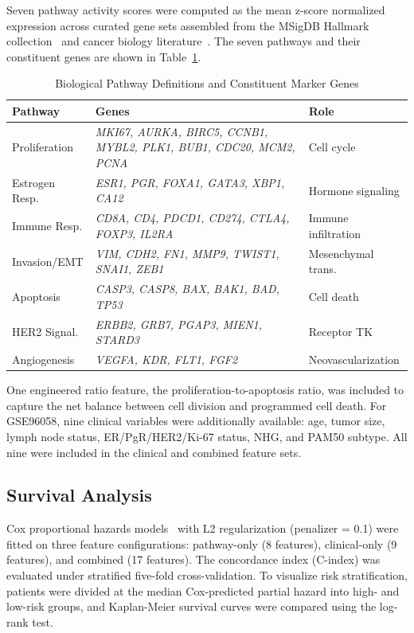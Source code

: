 \documentclass[journal]{IEEEtran}
\begin{document}
Seven pathway activity scores were computed as the mean z-score normalized expression across curated gene sets assembled from the MSigDB Hallmark collection~\cite{liberzon2015} and cancer biology literature~\cite{hanahan2011}. The seven pathways and their constituent genes are shown in Table~\ref{tab:pathways}.

\begin{table}[!t]
\centering
\caption{Biological Pathway Definitions and Constituent Marker Genes}
\label{tab:pathways}
\footnotesize
\begin{tabular}{p{1.6cm} p{3.6cm} p{1.8cm}}
\toprule
\textbf{Pathway} & \textbf{Genes} & \textbf{Role} \\
\midrule
Proliferation & \textit{MKI67, AURKA, BIRC5, CCNB1, MYBL2, PLK1, BUB1, CDC20, MCM2, PCNA} & Cell cycle \\
Estrogen Resp. & \textit{ESR1, PGR, FOXA1, GATA3, XBP1, CA12} & Hormone signaling \\
Immune Resp. & \textit{CD8A, CD4, PDCD1, CD274, CTLA4, FOXP3, IL2RA} & Immune infiltration \\
Invasion/EMT & \textit{VIM, CDH2, FN1, MMP9, TWIST1, SNAI1, ZEB1} & Mesenchymal trans. \\
Apoptosis & \textit{CASP3, CASP8, BAX, BAK1, BAD, TP53} & Cell death \\
HER2 Signal. & \textit{ERBB2, GRB7, PGAP3, MIEN1, STARD3} & Receptor TK \\
Angiogenesis & \textit{VEGFA, KDR, FLT1, FGF2} & Neovascularization \\
\bottomrule
\end{tabular}
\end{table}

One engineered ratio feature, the proliferation-to-apoptosis ratio, was included to capture the net balance between cell division and programmed cell death. For GSE96058, nine clinical variables were additionally available: age, tumor size, lymph node status, ER/PgR/HER2/Ki-67 status, NHG, and PAM50 subtype. All nine were included in the clinical and combined feature sets.

\subsection{Survival Analysis}

Cox proportional hazards models~\cite{cox1972} with L2 regularization (penalizer = 0.1) were fitted on three feature configurations: pathway-only (8 features), clinical-only (9 features), and combined (17 features). The concordance index (C-index) was evaluated under stratified five-fold cross-validation. To visualize risk stratification, patients were divided at the median Cox-predicted partial hazard into high- and low-risk groups, and Kaplan-Meier survival curves were compared using the log-rank test.
\end{document}
